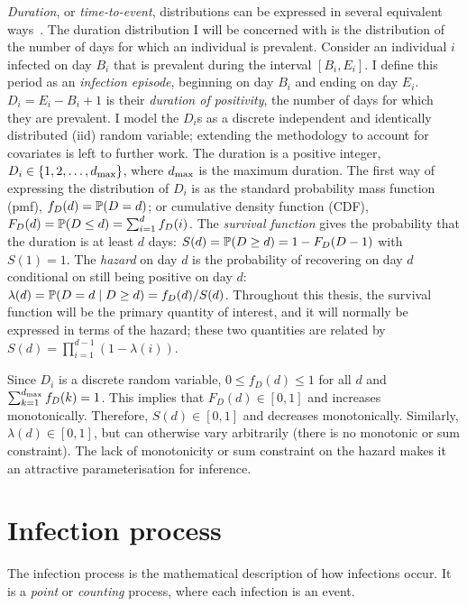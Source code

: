 \documentclass[thesis.tex]{subfiles}
\begin{document}
\emph{Duration}, or \emph{time-to-event}, distributions can be expressed in several equivalent ways~\autocite[17]{sunStatisticala}.
The duration distribution I will be concerned with is the distribution of the number of days for which an individual is prevalent.
Consider an individual $i$ infected on day $B_i$ that is prevalent during the interval $[B_i, E_i]$.
I define this period as an \emph{infection episode}, beginning on day $B_i$ and ending on day $E_i$.
$D_i = E_i - B_i + 1$ is their \emph{duration of positivity}, the number of days for which they are prevalent.
I model the $D_i$s as a discrete independent and identically distributed (iid) random variable; extending the methodology to account for covariates is left to further work.
The duration is a positive integer, \ie $D_i \in \{1, 2, \dots, d_\text{max} \}$, where $d_\text{max}$ is the maximum duration.
The first way of expressing the distribution of $D_i$ is as the standard probability mass function (pmf), $f_{D}(d) = \operatorname{\mathbb{P}}(D = d)$; or cumulative density function (CDF), $F_{D}(d) = \operatorname{\mathbb{P}}(D \leq d) = \sum_{i=1}^d f_{D}(i)$.
The \emph{survival function} gives the probability that the duration is at least $d$ days: $S(d) = \operatorname{\mathbb{P}}(D \geq d) = 1 - F_{D}(D - 1)$ with $S(1) = 1$.
The \emph{hazard} on day $d$ is the probability of recovering on day $d$ conditional on still being positive on day $d$: $\lambda(d) = \operatorname{\mathbb{P}}(D = d \mid D \geq d) = f_{D}(d) / S(d)$.
Throughout this thesis, the survival function will be the primary quantity of interest, and it will normally be expressed in terms of the hazard; these two quantities are related by $S(d) = \prod_{i=1}^{d-1} (1 - \lambda(i))$.

Since $D_i$ is a discrete random variable, $0 \leq f_D(d) \leq 1$ for all $d$ and $\sum_{k=1}^{d_\text{max}} f_D(k) = 1$.
This implies that $F_D(d) \in [0, 1]$ and increases monotonically.
Therefore, $S(d) \in [0, 1]$ and decreases monotonically.
Similarly, $\lambda(d) \in [0,1]$, but can otherwise vary arbitrarily (\ie there is no monotonic or sum constraint).
The lack of monotonicity or sum constraint on the hazard makes it an attractive parameterisation for inference.

\section{Infection process} \label{inc-prev:sec:infection-process}
The infection process is the mathematical description of how infections occur.
It is a \emph{point} or \emph{counting} process, where each infection is an event.
\end{document}
